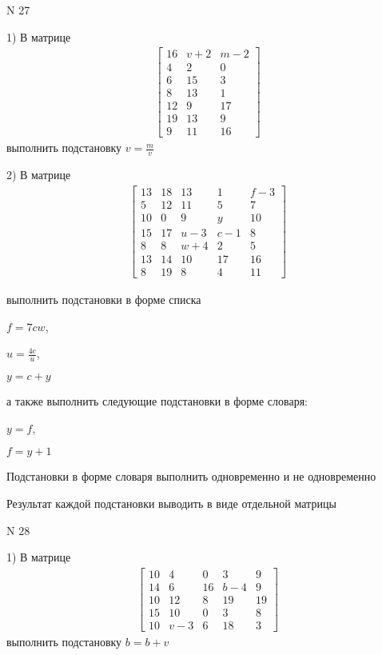 \documentclass[11pt]{report}
\begin{document}
\newpage
N 27


    1) В матрице
\begin{align*}
\left[\begin{matrix}16 & v + 2 & m - 2\\4 & 2 & 0\\6 & 15 & 3\\8 & 13 & 1\\12 & 9 & 17\\19 & 13 & 9\\9 & 11 & 16\end{matrix}\right]
\end{align*}
выполнить подстановку $v=\frac{m}{v}$


    2) В матрице
\begin{align*}
\left[\begin{matrix}13 & 18 & 13 & 1 & f - 3\\5 & 12 & 11 & 5 & 7\\10 & 0 & 9 & y & 10\\15 & 17 & u - 3 & c - 1 & 8\\8 & 8 & w + 4 & 2 & 5\\13 & 14 & 10 & 17 & 16\\8 & 19 & 8 & 4 & 11\end{matrix}\right]
\end{align*}

выполнить подстановки в форме списка

$f=7 c w$,

$u=\frac{4 c}{u}$,

$y=c + y$

а также выполнить следующие подстановки в форме словаря:

$y=f$,

$f=y + 1$


    Подстановки в форме словаря выполнить одновременно и не одновременно


    Результат каждой подстановки выводить в виде отдельной матрицы

\newpage
N 28


    1) В матрице
\begin{align*}
\left[\begin{matrix}10 & 4 & 0 & 3 & 9\\14 & 6 & 16 & b - 4 & 9\\10 & 12 & 8 & 19 & 19\\15 & 10 & 0 & 3 & 8\\10 & v - 3 & 6 & 18 & 3\end{matrix}\right]
\end{align*}
выполнить подстановку $b=b + v$
\end{document}
